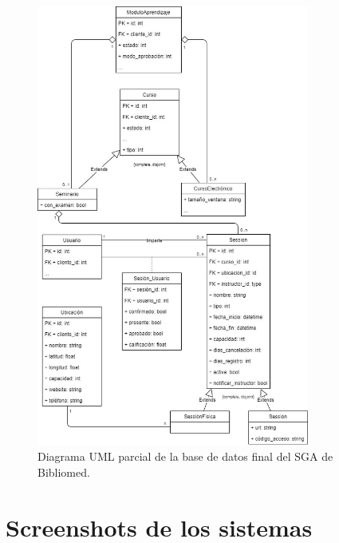\begin{figure}[t]
	\begin{center}
		\includegraphics[width=0.8\textwidth]{figuras/databaseBibliomed.jpg}
		\caption{Diagrama UML parcial de la base de datos final del SGA de Bibliomed.} \label{fig:baseDeDatosBibliomed}
		
	\end{center}
\end{figure}


\chapter{Screenshots de los sistemas}


